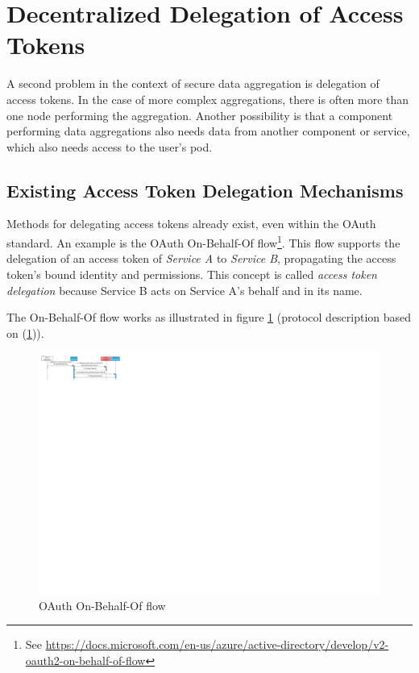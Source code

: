 \section{Decentralized Delegation of Access Tokens}
\label{sec:decentralized-delegation}
A second problem in the context of secure data aggregation is delegation of access tokens. In the case of more complex aggregations, there is often more than one node performing the aggregation. Another possibility is that a component performing data aggregations also needs data from another component or service, which also needs access to the user's pod. 

\subsection{Existing Access Token Delegation Mechanisms}
Methods for delegating access tokens already exist, even within the OAuth standard. An example is the OAuth On-Behalf-Of flow\footnote{\label{fn:obo}See \url{https://docs.microsoft.com/en-us/azure/active-directory/develop/v2-oauth2-on-behalf-of-flow}}. This flow supports the delegation of an access token of \textit{Service A} to \textit{Service B}, propagating the access token's bound identity and permissions. This concept is called \textit{access token delegation} because Service B acts on Service A's behalf and in its name. 

The On-Behalf-Of flow works as illustrated in figure \ref{fig:obo-flow} (protocol description based on (\ref{fn:obo})). 

\begin{figure}[H]
    \centering
   \includegraphics[width=1.0\textwidth]{images/macaroons-solid/InteractionDiagram-OBO-Flow.pdf}
    \caption{OAuth On-Behalf-Of flow}
    \label{fig:obo-flow}
\end{figure}

